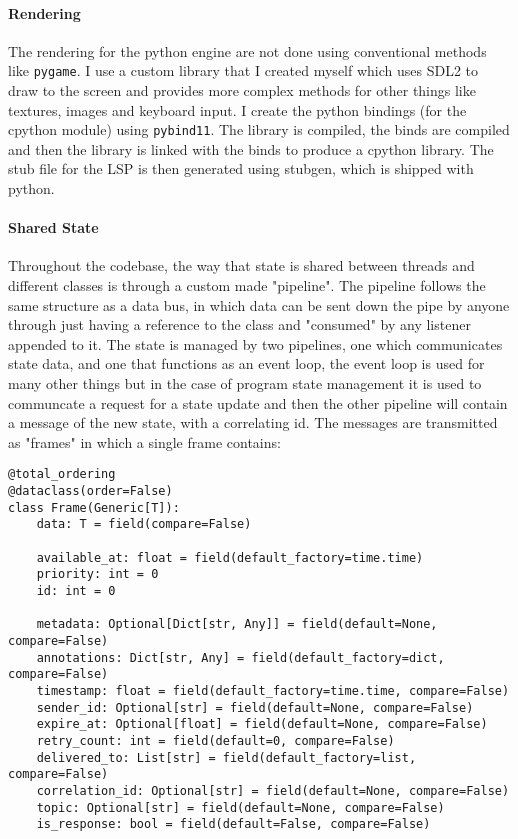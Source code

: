 \documentclass{article}
\begin{document}
\paragraph{Rendering}
The rendering for the python engine are not done using conventional methods like \verb|pygame|. I use a custom library that I created myself which uses SDL2 to draw to the screen and provides more complex methods for other things like textures, images and keyboard input. I create the python bindings (for the cpython module) using \verb|pybind11|. The library is compiled, the binds are compiled and then the library is linked with the binds to produce a cpython library. The stub file for the LSP is then generated using stubgen, which is shipped with python.

\paragraph{Shared State}
\label{pipeline}
Throughout the codebase, the way that state is shared between threads and different classes is through a custom made "pipeline". The pipeline follows the same structure as a data bus, in which data can be sent down the pipe by anyone through just having a reference to the class and "consumed" by any listener appended to it. The state is managed by two pipelines, one which communicates state data, and one that functions as an event loop, the event loop is used for many other things but in the case of program state management it is used to communcate a request for a state update and then the other pipeline will contain a message of the new state, with a correlating id. The messages are transmitted as "frames" in which a single frame contains:

\begin{verbatim}
@total_ordering
@dataclass(order=False)
class Frame(Generic[T]):
    data: T = field(compare=False)

    available_at: float = field(default_factory=time.time)  
    priority: int = 0  
    id: int = 0  

    metadata: Optional[Dict[str, Any]] = field(default=None, compare=False)
    annotations: Dict[str, Any] = field(default_factory=dict, compare=False)
    timestamp: float = field(default_factory=time.time, compare=False)
    sender_id: Optional[str] = field(default=None, compare=False)
    expire_at: Optional[float] = field(default=None, compare=False)
    retry_count: int = field(default=0, compare=False)
    delivered_to: List[str] = field(default_factory=list, compare=False)
    correlation_id: Optional[str] = field(default=None, compare=False)
    topic: Optional[str] = field(default=None, compare=False)
    is_response: bool = field(default=False, compare=False)
\end{verbatim}
\end{document}
